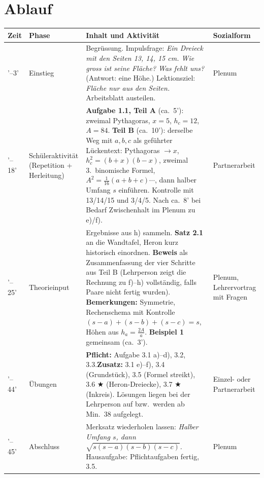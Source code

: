 \documentclass[11pt,oneside]{article}
\begin{document}
\section*{Ablauf}
\renewcommand{\arraystretch}{1.3}
\begin{tabularx}{\textwidth}{|>{\raggedright\arraybackslash}p{11mm}|>{\raggedright\arraybackslash}p{27mm}|X|>{\raggedright\arraybackslash}p{22mm}|}\hline
	\textbf{Zeit} & \textbf{Phase} & \textbf{Inhalt und Aktivität} & \textbf{Sozialform}\\\hline
	0'--3' & Einstieg & Begrüssung. Impulsfrage: \textit{Ein Dreieck mit den Seiten 13, 14, 15 cm. Wie gross ist seine Fläche? Was fehlt uns?} (Antwort: eine Höhe.) Lektionsziel: \textit{Fläche nur aus den Seiten.} Arbeitsblatt austeilen. & Plenum\\\hline
	3'--18' & Schüleraktivität (Repetition + Herleitung) & \textbf{Aufgabe 1.1, Teil A} (ca.\ 5'): zweimal Pythagoras, $x=5$, $h_c=12$, $A=84$. \textbf{Teil B} (ca.\ 10'): derselbe Weg mit $a,b,c$ als geführter Lückentext: Pythagoras $\to x$, $h_c^2=(b+x)(b-x)$, zweimal 3.\ binomische Formel, $A^2=\frac{1}{16}(a+b+c)\cdots$, dann halber Umfang $s$ einführen. Kontrolle mit 13/14/15 und 3/4/5. Nach ca.\ 8' bei Bedarf Zwischenhalt im Plenum zu e)/f). & Partnerarbeit\\\hline
	18'--25' & Theorieinput & Ergebnisse aus h) sammeln. \textbf{Satz 2.1} an die Wandtafel, Heron kurz historisch einordnen. \textbf{Beweis} als Zusammenfassung der vier Schritte aus Teil B (Lehrperson zeigt die Rechnung zu f)--h) vollständig, falls Paare nicht fertig wurden). \textbf{Bemerkungen:} Symmetrie, Rechenschema mit Kontrolle $(s-a)+(s-b)+(s-c)=s$, Höhen aus $h_a=\frac{2A}{a}$. \textbf{Beispiel 1} gemeinsam (ca.\ 3'). & Plenum, Lehrervortrag mit Fragen\\\hline
	25'--44' & Übungen & \textbf{Pflicht:} Aufgabe 3.1 a)--d), 3.2, 3.3.\newline \textbf{Zusatz:} 3.1 e)--f), 3.4 (Grundstück), 3.5 (Formel streikt), 3.6 $\bigstar$ (Heron-Dreiecke), 3.7 $\bigstar$ (Inkreis). Lösungen liegen bei der Lehrperson auf bzw.\ werden ab Min.\ 38 aufgelegt. & Einzel- oder Partnerarbeit\\\hline
	44'--45' & Abschluss & Merksatz wiederholen lassen: \textit{Halber Umfang $s$, dann $\sqrt{s(s-a)(s-b)(s-c)}$.} Hausaufgabe: Pflichtaufgaben fertig, 3.5. & Plenum\\\hline
\end{tabularx}
\end{document}
